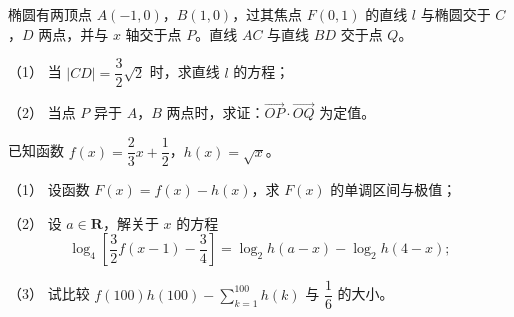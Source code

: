 \begin{question}
椭圆有两顶点 $A(-1,0)$，$B(1,0)$，过其焦点 $F(0,1)$ 的直线 $l$ 与椭圆交于 $C$，$D$ 两点，并与 $x$ 轴交于点 $P$。直线 $AC$ 与直线 $BD$ 交于点 $Q$。

（1） 当 $|CD|=\dfrac32\sqrt2$ 时，求直线 $l$ 的方程；

（2） 当点 $P$ 异于 $A$，$B$ 两点时，求证：$\overrightarrow{OP}\cdot\overrightarrow{OQ}$ 为定值。
\nopagebreak[4]
\begin{center}\end{center}
\nopagebreak[4]
\end{question}
\begin{question}
已知函数 $f(x)=\dfrac23x+\dfrac12$，$h(x)=\sqrt x$。

（1） 设函数 $F(x)=f(x)-h(x)$，求 $F(x)$ 的单调区间与极值；

（2） 设 $a\in\mathbf R$，解关于 $x$ 的方程
\nopagebreak[4]
\[\log_4\left[\frac32f(x-1)-\frac34\right]=\log_2h(a-x)-\log_2h(4-x);\]

（3） 试比较 $f(100)h(100)-\displaystyle\sum_{k=1}^{100}h(k)$ 与 $\dfrac16$ 的大小。

\end{question}